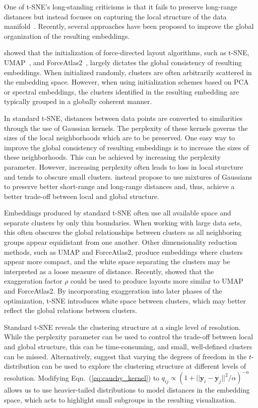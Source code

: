 \documentclass[article]{jss}
\begin{document}
One of t-SNE's long-standing criticisms is that it fails to preserve long-range
distances but instead focuses on capturing the local structure of the data
manifold~\citep{becht2019dimensionality}. Recently, several approaches have been
proposed to improve the global organization of the resulting embeddings.

\citet{kobak2019umap} showed that the initialization of force-directed layout
algorithms, such as t-SNE, UMAP~\citep{2018arXivUMAP}, and
ForceAtlas2~\citep{jacomy2014forceatlas2}, largely dictates the global
consistency of resulting embeddings. When initialized randomly, clusters are
often arbitrarily scattered in the embedding space. However, when using
initialization schemes based on PCA or spectral embeddings, the clusters
identified in the resulting embedding are typically grouped in a globally
coherent manner.

In standard t-SNE, distances between data points are converted to similarities
through the use of Gaussian kernels. The perplexity of these kernels governs the
sizes of the local neighborhoods which are to be preserved. One easy way to
improve the global consistency of resulting embeddings is to increase the sizes
of these neighborhoods. This can be achieved by increasing the perplexity
parameter. However, increasing perplexity often leads to loss in local sturcture
and tends to obscure small clusters. \citet{kobak2019art} instead propose to use
mixtures of Gaussians to preserve better short-range and long-range distances
and, thus, achieve a better trade-off between local and global structure.

Embeddings produced by standard t-SNE often use all available space and separate
clusters by only thin boundaries. When working with large data sets, this often
obscures the global relationships between clusters as all neighboring groups
appear equidistant from one another.  Other dimensionality reduction methods,
such as UMAP and ForceAtlas2, produce embeddings where clusters appear more
compact, and the white space separating the clusters may be interpreted as a
loose measure of distance. Recently, \citet{bohm2020unifying} showed that the
exaggeration factor $\rho$ could be used to produce layouts more similar to UMAP
and ForceAtlas2. By incorporating exaggeration into later phases of the
optimization, t-SNE introduces white space between clusters, which may better
reflect the global relations between clusters.

Standard t-SNE reveals the clustering structure at a single level of resolution.
While the perplexity parameter can be used to control the trade-off between
local and global structure, this can be time-consuming, and small, well-defined
clusters can be missed. Alternatively, \citet{kobak2019heavy} suggest that
varying the degrees of freedom in the $t$-distribution can be used to explore
the clustering structure at different levels of resolution. Modifying
Eqn.~(\ref{eq:cauchy_kernel}) to $q_{ij} \propto \left ( 1 + || \mathbf{y}_i -
\mathbf{y}_j ||^2 / \alpha \right )^{-\alpha}$ allows us to use heavier-tailed
distributions to model distances in the embedding space, which acts to highlight
small subgroups in the resulting visualization.
\end{document}
